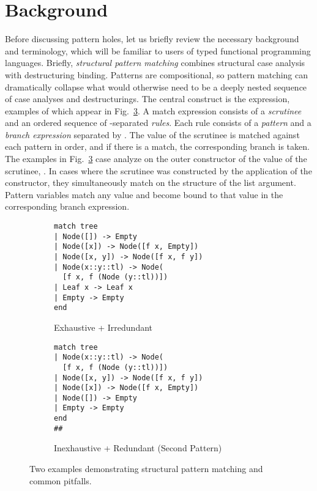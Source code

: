 \section{Background}
\label{sec:background}
Before discussing pattern holes, let us briefly review the necessary background and terminology, which will be familiar to users of typed functional programming languages. 
Briefly,
\emph{structural pattern matching} combines structural case analysis with destructuring binding. 
Patterns are compositional, so pattern matching can dramatically collapse what would otherwise 
need to be a deeply nested sequence of case analyses and destructurings. The central construct is the  expression, examples of which appear in  Fig.~\ref{fig:basic-examples}. A match expression consists of a \emph{scrutinee} and an ordered sequence of \li{|}-separated \emph{rules}. Each rule consists of a \emph{pattern} and a \emph{branch expression} separated by \li{->}. The value of the scrutinee is matched against each pattern in order, and if there is a match, the corresponding branch is taken. The examples in  Fig.~\ref{fig:basic-examples} 
case analyze on the outer constructor of the value of the {scrutinee}, . In cases where the scrutinee was constructed by the application of the  constructor, they simultaneously match on the structure of the list argument. Pattern variables match any value and become bound to that value in the corresponding branch expression.

\begin{figure}
\begin{subfigure}{.45\textwidth}
\begin{lstlisting}[numbers=none]
match tree
| Node([]) -> Empty
| Node([x]) -> Node([f x, Empty])
| Node([x, y]) -> Node([f x, f y])
| Node(x::y::tl) -> Node(
  [f x, f (Node (y::tl))])
| Leaf x -> Leaf x
| Empty -> Empty
end
\end{lstlisting}
\caption{Exhaustive + Irredundant\label{fig:basic-examples-correct}}
\end{subfigure}
\begin{subfigure}{.5\textwidth}
\begin{lstlisting}[numbers=none]
match tree
| Node(x::y::tl) -> Node(
  [f x, f (Node (y::tl))])
| Node([x, y]) -> Node([f x, f y])
| Node([x]) -> Node([f x, Empty])
| Node([]) -> Empty
| Empty -> Empty
end
##
\end{lstlisting}
\caption{Inexhaustive + Redundant (Second Pattern)\label{fig:basic-examples-wrong}}
\end{subfigure}
\caption{Two examples demonstrating structural pattern matching and common pitfalls.}
\label{fig:basic-examples}
\end{figure}

